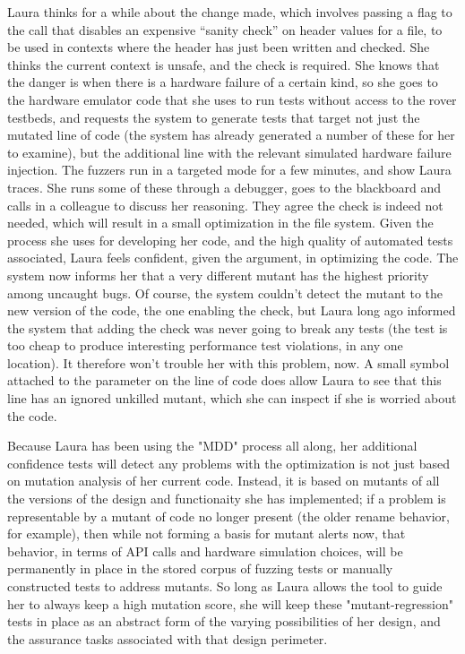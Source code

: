 Laura thinks for a while about the change made, which involves passing a flag to the call that disables an expensive ``sanity check'' on header values for a file, to be used in contexts where the header has just been written and checked.  She thinks the current context is unsafe, and the check is required.  She knows that the danger is when there is a hardware failure of a certain kind, so she goes to the hardware emulator code that she uses to run tests without access to the rover testbeds, and requests the system to generate tests that target not just the mutated line of code (the system has already generated a number of these for her to examine), but the additional line with the relevant simulated hardware failure injection.  The fuzzers run in a targeted mode for a few minutes, and show Laura traces.  She runs some of these through a debugger, goes to the blackboard and calls in a colleague to discuss her reasoning.  They agree the check is indeed not needed, which will result in a small optimization in the file system.  Given the process she uses for developing her code, and the high quality of automated tests associated, Laura feels confident, given the argument, in optimizing the code.  The system now informs her that a very different mutant has the highest priority among uncaught bugs.  Of course, the system couldn't detect the mutant to the new version of the code, the one enabling the check, but Laura long ago informed the system that adding the check was never going to break any tests (the test is too cheap to produce interesting performance test violations, in any one location).  It therefore won't trouble her with this problem, now.  A small symbol attached to the parameter on the line of code does allow Laura to see that this line has an ignored unkilled mutant, which she can inspect if she is worried about the code.

Because Laura has been using the "MDD" process all along, her additional confidence tests will detect any problems with the optimization is not just based on mutation analysis of her current code.  Instead, it is based on mutants of all the versions of the design and functionaity she has implemented; if a problem is representable by a mutant of code no longer present (the older rename behavior, for example), then while not forming a basis for mutant alerts now, that behavior, in terms of API calls and hardware simulation choices, will be permanently in place in the stored corpus of fuzzing tests or manually constructed tests to address mutants.  So long as Laura allows the tool to guide her to always keep a high mutation score, she will keep these "mutant-regression" tests in place as an abstract form of the varying possibilities of her design, and the assurance tasks associated with that design perimeter.